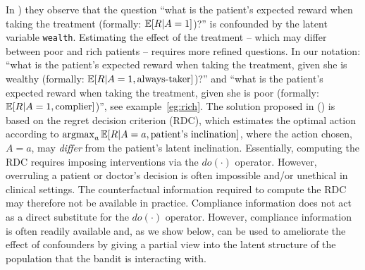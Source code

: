 In \cite{bareinboim:15}) they observe that the question ``what is the patient's expected reward when taking the treatment (formally: $\operatorname*{\mathbb E}[R|{A=1}]$)?'' is confounded by the latent variable \texttt{wealth}. Estimating the effect of the treatment -- which may differ between poor and rich patients -- requires more refined questions. In our notation: 
``what is the patient's expected reward when taking the treatment, given she is wealthy (formally: $\operatorname*{\mathbb E}[R|{A=1}, \text{always-taker}]$)?'' and  ``what is the patient's expected reward when taking the treatment, given she is poor (formally: $\operatorname*{\mathbb E}[R|{A=1}, \text{complier}]$)'', see example~\ref{eg:rich}.
The solution proposed in (\cite{bareinboim:15}) is based on the regret decision criterion (RDC), which estimates the optimal action according to $\operatorname*{argmax}_{a}\operatorname*{\mathbb E}[R|A=a,\text{patient's inclination}]$, where the action chosen, $A=a$, may \emph{differ} from the patient's latent inclination. Essentially, computing the RDC requires imposing interventions via the $do(\cdot)$ operator. However, overruling a patient or doctor's decision is often impossible and/or unethical in clinical settings. The counterfactual information required to compute the RDC may therefore not be available in practice.
Compliance information does not act as a direct substitute for the $do(\cdot)$ operator. However, compliance information is often readily available and, as we show below, can be used to ameliorate the effect of confounders by giving a partial view into the latent structure of the population that the bandit is interacting with.





